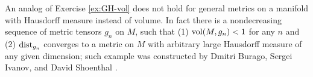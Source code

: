 An analog of Exercise \ref{ex:GH-vol} does not hold for general metrics on a manifold with Hausdorff measure instead of volume.
In fact there is a nondecreasing sequence of metric tensors $g_n$ on $M$, such that (1) $\operatorname{\rm vol}\nolimits(M,g_n)<1$ for any $n$ and (2) $\mathrm{dist}_{g_n}$ converges to a metric on $M$ with arbitrary large Hausdorff measure of any given dimension; such example was constructed by Dmitri Burago, Sergei Ivanov, and David Shoenthal \cite{burago-ivanov-shoenthal}.
